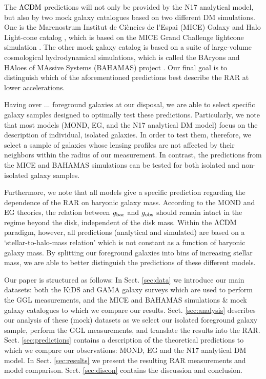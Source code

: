 \documentclass[fleqn,usenatbib]{mnras}
\newcommand{\lcdm}{{\rm \Lambda CDM}}
\newcommand{\un}[1]{_{\rm #1}}
\begin{document}
The $\lcdm$ predictions will not only be provided by the N17 analytical model, but also by two mock galaxy catalogues based on two different DM simulations. One is the Marenostrum Institut de Ci{\`e}ncies de l'Espai (MICE) Galaxy and Halo Light-cone catalog \cite[]{carretero2015,hoffmann2015}, which is based on the MICE Grand Challenge lightcone simulation \cite[MICE-GC,][]{fosalba2015a,fosalba2015b,crocce2015}. The other mock galaxy catalog is based on a suite of large-volume cosmological hydrodynamical simulations, which is called the BAryons and HAloes of MAssive Systems (BAHAMAS) project \cite[]{mccarthy2017}. Our final goal is to distinguish which of the aforementioned predictions best describe the RAR at lower accelerations.

Having over ... foreground galaxies at our disposal, we are able to select specific galaxy samples designed to optimally test these predictions. Particularly, we note that most models (MOND, EG, and the N17 analytical DM model) focus on the description of individual, isolated galaxies. In order to test them, therefore, we select a sample of galaxies whose lensing profiles are not affected by their neighbors within the radius of our measurement. In contrast, the predictions from the MICE and BAHAMAS simulations can be tested for both isolated and non-isolated galaxy samples.

Furthermore, we note that all models give a specific prediction regarding the dependence of the RAR on baryonic galaxy mass. According to the MOND and EG theories, the relation between $g\un{bar}$ and $g\un{obs}$ should remain intact in the regime beyond the disk, independent of the disk mass. Within the $\lcdm$ paradigm, however, all predictions (analytical and simulated) are based on a `stellar-to-halo-mass relation' which is not constant as a function of baryonic galaxy mass. By splitting our foreground galaxies into bins of increasing stellar mass, we are able to better distinguish the predictions of these different models.

Our paper is structured as follows: In Sect. \ref{sec:data} we introduce our main datasets: both the KiDS and GAMA galaxy surveys which are used to perform the GGL measurements, and the MICE and BAHAMAS simulations \& mock galaxy catalogues to which we compare our results. Sect. \ref{sec:analysis} describes our analysis of these (mock) datasets as we select our isolated foreground galaxy sample, perform the GGL measurements, and translate the results into the RAR. Sect. \ref{sec:predictions} contains a description of the theoretical predictions to which we compare our observations: MOND, EG and the N17 analytical DM model. In Sect. \ref{sec:results} we present the resulting RAR measurements and model comparison. Sect. \ref{sec:discon} contains the discussion and conclusion.
\end{document}
